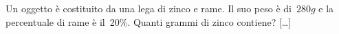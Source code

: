 \begin{multicols}{2}
% 
% 
% 

\begin{esercizio}
\label{ese:3.179}
 Un oggetto è costituito da una lega di zinco e rame. Il suo peso
è di~$280\unit{g}$ e la percentuale di rame è il~20\%. Quanti grammi di zinco
contiene? \hfill [\dots]
\end{esercizio}

% 
% 


\end{multicols}
